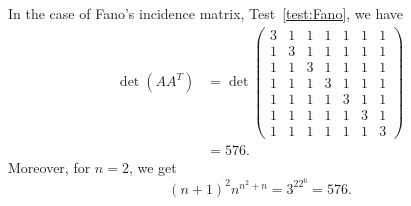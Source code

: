 \begin{test}
    In the case of Fano's incidence matrix, Test~\ref{test:Fano}, we have
    \begin{align*}
        \det(AA^T) &=
            \det\begin{pmatrix}
                3 & 1 & 1 & 1 & 1 & 1 & 1 \\
                1 & 3 & 1 & 1 & 1 & 1 & 1 \\
                1 & 1 & 3 & 1 & 1 & 1 & 1 \\
                1 & 1 & 1 & 3 & 1 & 1 & 1 \\
                1 & 1 & 1 & 1 & 3 & 1 & 1 \\
                1 & 1 & 1 & 1 & 1 & 3 & 1 \\
                1 & 1 & 1 & 1 & 1 & 1 & 3
            \end{pmatrix}\\
            &= 576.
    \end{align*}
    Moreover, for $n=2$, we get
    $$
        (n+1)^2n^{n^2+n} = 3^22^6 = 576.
    $$

\end{test}

